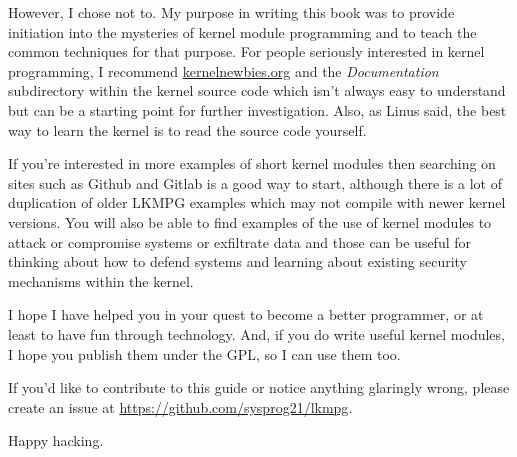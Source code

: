 \documentclass[10pt, oneside]{book}
\begin{document}
However, I chose not to. My purpose in writing this book was to provide initiation into the mysteries of kernel module programming and to teach the common techniques for that purpose. For people seriously interested in kernel programming, I recommend \href{https://kernelnewbies.org}{kernelnewbies.org} and the \emph{Documentation} subdirectory within the kernel source code which isn't always easy to understand but can be a starting point for further investigation. Also, as Linus said, the best way to learn the kernel is to read the source code yourself.

If you're interested in more examples of short kernel modules then searching on sites such as Github and Gitlab is a good way to start, although there is a lot of duplication of older LKMPG examples which may not compile with newer kernel versions. You will also be able to find examples of the use of kernel modules to attack or compromise systems or exfiltrate data and those can be useful for thinking about how to defend systems and learning about existing security mechanisms within the kernel.

I hope I have helped you in your quest to become a better programmer, or at least to have fun through technology. And, if you do write useful kernel modules, I hope you publish them under the GPL, so I can use them too.

If you'd like to contribute to this guide or notice anything glaringly wrong, please create an issue at \url{https://github.com/sysprog21/lkmpg}.

Happy hacking.
\end{document}

